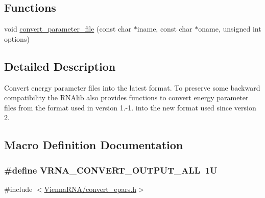 \subsection*{Functions}
\begin{DoxyCompactItemize}
\item 
void \hyperlink{group__energy__parameters__convert_gafbe538bc4eb2cf2a33326e1010005f8a}{convert\-\_\-parameter\-\_\-file} (const char $\ast$iname, const char $\ast$oname, unsigned int options)
\end{DoxyCompactItemize}


\subsection{Detailed Description}
Convert energy parameter files into the latest format. To preserve some backward compatibility the R\-N\-Alib also provides functions to convert energy parameter files from the format used in version 1.-\/1. into the new format used since version 2. 

\subsection{Macro Definition Documentation}
\hypertarget{group__energy__parameters__convert_ga8dc6aee5a806c49b71557152f9616bc4}{
\subsubsection[{V\-R\-N\-A\-\_\-\-C\-O\-N\-V\-E\-R\-T\-\_\-\-O\-U\-T\-P\-U\-T\-\_\-\-A\-L\-L}]{\setlength{\rightskip}{0pt plus 5cm}\#define V\-R\-N\-A\-\_\-\-C\-O\-N\-V\-E\-R\-T\-\_\-\-O\-U\-T\-P\-U\-T\-\_\-\-A\-L\-L~1\-U}}\label{group__energy__parameters__convert_ga8dc6aee5a806c49b71557152f9616bc4}


{\ttfamily \#include $<$\hyperlink{convert__epars_8h}{Vienna\-R\-N\-A/convert\-\_\-epars.\-h}$>$}

